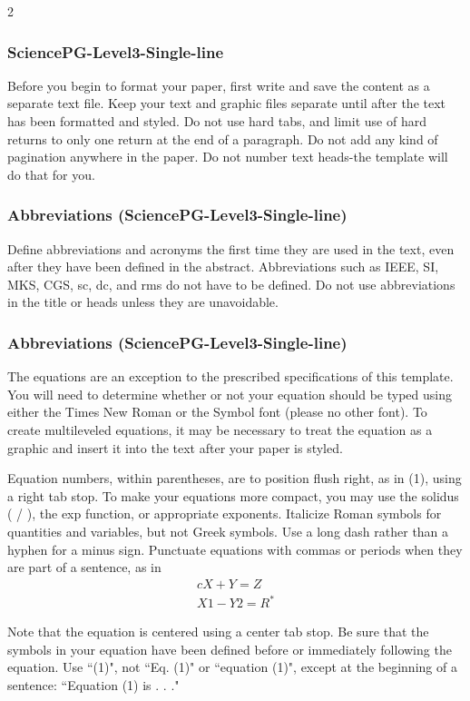 \documentclass{book}
\theoremstyle{remark}
\begin{document}
\begin{multicols}{2}
\subsubsection{SciencePG-Level3-Single-line}
Before you begin to format your paper, first write and save the content as a separate text file. Keep your text and graphic files separate until after the text has been formatted and styled. Do not use hard tabs, and limit use of hard returns to only one return at the end of a paragraph. Do not add any kind of pagination anywhere in the paper. Do not number text heads-the template will do that for you.

\subsubsection{Abbreviations (SciencePG-Level3-Single-line)}
Define abbreviations and acronyms the first time they are used in the text, even after they have been defined in the abstract. Abbreviations such as IEEE, SI, MKS, CGS, sc, dc, and rms do not have to be defined. Do not use abbreviations in the title or heads unless they are unavoidable.

\subsubsection{Abbreviations (SciencePG-Level3-Single-line)}
The equations are an exception to the prescribed specifications of this template. You will need to determine whether or not your equation should be typed using either the Times New Roman or the Symbol font (please no other font). To create multileveled equations, it may be necessary to treat the equation as a graphic and insert it into the text after your paper is styled.

Equation numbers, within parentheses, are to position flush right, as in (1), using a right tab stop. To make your equations more compact, you may use the solidus ( / ), the exp function, or appropriate exponents. Italicize Roman symbols for quantities and variables, but not Greek symbols. Use a long dash rather than a hyphen for a minus sign. Punctuate equations with commas or periods when they are part of a sentence, as in
\begin{align}{c}
X+Y=Z   \\
X1-Y2=R^*
\end{align}

Note that the equation is centered using a center tab stop. Be sure that the symbols in your equation have been defined before or immediately following the equation. Use ``(1)", not ``Eq. (1)" or ``equation (1)", except at the beginning of a sentence: ``Equation (1) is . . ."


\end{multicols}
\end{document}
